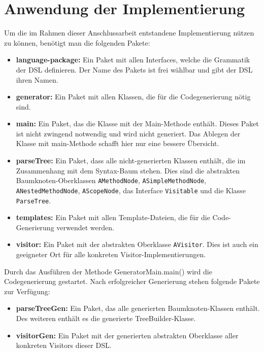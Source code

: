 
\chapter{Anwendung der Implementierung}\label{chp:6:ergebnis}
Um die im Rahmen dieser Anschlussarbeit entstandene Implementierung nützen zu können, benötigt man die folgenden Pakete:

\begin{itemize}
	\item \textbf{language-package:} Ein Paket mit allen Interfaces, welche die Grammatik der DSL definieren. Der Name des Pakets ist frei wählbar und gibt der DSL ihren Namen.
	\item \textbf{generator:} Ein Paket mit allen Klassen, die für die Codegenerierung nötig sind.
	\item \textbf{main:} Ein Paket, das die Klasse mit der Main-Methode enthält. Dieses Paket ist nicht zwingend notwendig und wird nicht generiert. Das Ablegen der Klasse mit main-Methode schafft hier nur eine bessere Übersicht.
	\item \textbf{parseTree:} Ein Paket, dass alle nicht-generierten Klassen enthält, die im Zusammenhang mit dem Syntax-Baum stehen. Dies sind die abstrakten Baumknoten-Oberklassen \texttt{AMethodNode}, \texttt{ASimpleMethodNode},\\ \texttt{ANestedMethodNode}, \texttt{AScopeNode}, das Interface \texttt{Visitable} und die Klasse \texttt{ParseTree}.
	\item \textbf{templates:} Ein Paket mit allen Template-Dateien, die für die Code-Generierung verwendet werden.
	\item \textbf{visitor:} Ein Paket mit der abstrakten Oberklasse \texttt{AVisitor}. Dies ist auch ein geeigneter Ort für alle konkreten Visitor-Implementierungen.
\end{itemize}

\noindent
Durch das Ausführen der Methode GeneratorMain.main() wird die Codegenerierung  gestartet.
Nach erfolgreicher Generierung stehen folgende Pakete zur Verfügung:

\begin{itemize}
	\item \textbf{parseTreeGen:} Ein Paket, das alle generierten Baumknoten-Klassen enthält. Des weiteren enthält es die generierte TreeBuilder-Klasse.
	\item \textbf{visitorGen:} Ein Paket mit der generierten abstrakten Oberklasse aller konkreten Visitors dieser DSL.
\end{itemize}

